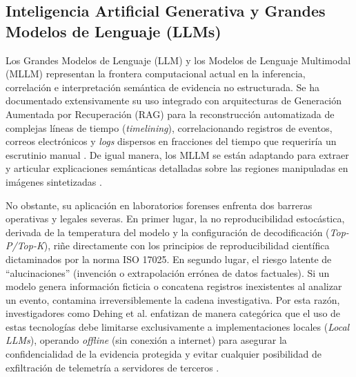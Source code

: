 \documentclass[journal]{IEEEtran}
\begin{document}
\subsection{Inteligencia Artificial Generativa y Grandes Modelos de Lenguaje (LLMs)}
Los Grandes Modelos de Lenguaje (LLM) y los Modelos de Lenguaje Multimodal (MLLM) representan la frontera computacional actual en la inferencia, correlación e interpretación semántica de evidencia no estructurada. Se ha documentado extensivamente su uso integrado con arquitecturas de Generación Aumentada por Recuperación (RAG) para la reconstrucción automatizada de complejas líneas de tiempo (\textit{timelining}), correlacionando registros de eventos, correos electrónicos y \textit{logs} dispersos en fracciones del tiempo que requeriría un escrutinio manual \cite{LoumachiFatmaYasmine2025ACIT}. De igual manera, los MLLM se están adaptando para extraer y articular explicaciones semánticas detalladas sobre las regiones manipuladas en imágenes sintetizadas \cite{10.1145/3733102.3733138}.

No obstante, su aplicación en laboratorios forenses enfrenta dos barreras operativas y legales severas. En primer lugar, la no reproducibilidad estocástica, derivada de la temperatura del modelo y la configuración de decodificación (\textit{Top-P/Top-K}), riñe directamente con los principios de reproducibilidad científica dictaminados por la norma ISO 17025. En segundo lugar, el riesgo latente de ``alucinaciones'' (invención o extrapolación errónea de datos factuales). Si un modelo genera información ficticia o concatena registros inexistentes al analizar un evento, contamina irreversiblemente la cadena investigativa. Por esta razón, investigadores como Dehing et al. enfatizan de manera categórica que el uso de estas tecnologías debe limitarse exclusivamente a implementaciones locales (\textit{Local LLMs}), operando \textit{offline} (sin conexión a internet) para asegurar la confidencialidad de la evidencia protegida y evitar cualquier posibilidad de exfiltración de telemetría a servidores de terceros \cite{DehingYing2026SRGu}.
\end{document}
